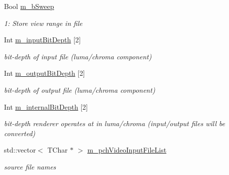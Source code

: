 \begin{DoxyCompactItemize}
Bool \hyperlink{class_t_app_renderer_cfg_a83a77a0cbaa0e80f11cdbba4c9949ea3}{m\+\_\+b\+Sweep}
\begin{DoxyCompactList}\small\item\em 1\+: Store view range in file \end{DoxyCompactList}\item 
\mbox{\label{class_t_app_renderer_cfg_af34a98b64fb3c56845e4d16fadc72f72}} 
Int \hyperlink{class_t_app_renderer_cfg_af34a98b64fb3c56845e4d16fadc72f72}{m\+\_\+input\+Bit\+Depth} \mbox{[}2\mbox{]}
\begin{DoxyCompactList}\small\item\em bit-\/depth of input file (luma/chroma component) \end{DoxyCompactList}\item 
\mbox{\label{class_t_app_renderer_cfg_a02e7c1a9c71ed007a43fcc9f48768cbd}} 
Int \hyperlink{class_t_app_renderer_cfg_a02e7c1a9c71ed007a43fcc9f48768cbd}{m\+\_\+output\+Bit\+Depth} \mbox{[}2\mbox{]}
\begin{DoxyCompactList}\small\item\em bit-\/depth of output file (luma/chroma component) \end{DoxyCompactList}\item 
\mbox{\label{class_t_app_renderer_cfg_a967273e682854f89f56c068358e4bd14}} 
Int \hyperlink{class_t_app_renderer_cfg_a967273e682854f89f56c068358e4bd14}{m\+\_\+internal\+Bit\+Depth} \mbox{[}2\mbox{]}
\begin{DoxyCompactList}\small\item\em bit-\/depth renderer operates at in luma/chroma (input/output files will be converted) \end{DoxyCompactList}\item 
\mbox{\label{class_t_app_renderer_cfg_a205749ae0a4dc074bfd8fbd7301b88c6}} 
std\+::vector$<$ T\+Char $\ast$ $>$ \hyperlink{class_t_app_renderer_cfg_a205749ae0a4dc074bfd8fbd7301b88c6}{m\+\_\+pch\+Video\+Input\+File\+List}
\begin{DoxyCompactList}\small\item\em source file names \end{DoxyCompactList}\item 
\mbox{\label{class_t_app_renderer_cfg_a09f816330c996f70000b5a5f40b0d3d7}} 

\end{DoxyCompactItemize}
